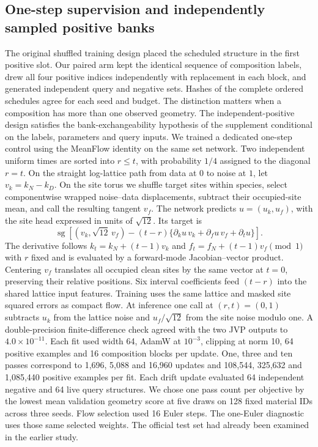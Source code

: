 \subsection{One-step supervision and independently sampled positive banks}
The original shuffled training design placed the scheduled structure in the first positive slot. Our paired arm kept the identical sequence of composition labels, drew all four positive indices independently with replacement in each block, and generated independent query and negative sets. Hashes of the complete ordered schedules agree for each seed and budget. The distinction matters when a composition has more than one observed geometry. The independent-positive design satisfies the bank-exchangeability hypothesis of the supplement conditional on the labels, parameters and query inputs.
We trained a dedicated one-step control using the MeanFlow identity \cite{meanflow} on the same set network. Two independent uniform times are sorted into $r\leq t$, with probability $1/4$ assigned to the diagonal $r=t$. On the straight log-lattice path from data at $0$ to noise at $1$, let $v_k=k_N-k_D$. On the site torus we shuffle target sites within species, select componentwise wrapped noise--data displacements, subtract their occupied-site mean, and call the resulting tangent $v_f$. The network predicts $u=(u_k,u_f)$, with the site head expressed in units of $\sqrt{12}$. Its target is
\[ \operatorname{sg}\!\left[(v_k,\sqrt{12}\,v_f)-(t-r)\{\partial_k u\,v_k+\partial_f u\,v_f+\partial_t u\}\right]. \]
The derivative follows $k_t=k_N+(t-1)v_k$ and $f_t=f_N+(t-1)v_f\pmod 1$ with $r$ fixed and is evaluated by a forward-mode Jacobian--vector product. Centering $v_f$ translates all occupied clean sites by the same vector at $t=0$, preserving their relative positions. Six interval coefficients feed $(t-r)$ into the shared lattice input features. Training uses the same lattice and masked site squared errors as compact flow. At inference one call at $(r,t)=(0,1)$ subtracts $u_k$ from the lattice noise and $u_f/\sqrt{12}$ from the site noise modulo one. A double-precision finite-difference check agreed with the two JVP outputs to $4.0\times10^{-11}$.
Each fit used width 64, AdamW at $10^{-3}$, clipping at norm 10, 64 positive examples and 16 composition blocks per update. One, three and ten passes correspond to 1,696, 5,088 and 16,960 updates and 108,544, 325,632 and 1,085,440 positive examples per fit. Each drift update evaluated 64 independent negative and 64 live query structures. We chose one pass count per objective by the lowest mean validation geometry score at five draws on 128 fixed material IDs across three seeds. Flow selection used 16 Euler steps. The one-Euler diagnostic uses those same selected weights. The official test set had already been examined in the earlier study.
